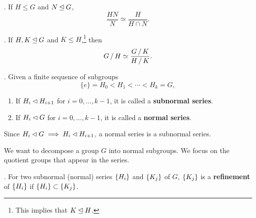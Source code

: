 \thm.  If \(H \leq G\) and \(N \unlhd G\),
\[
    \frac{HN}{N} \simeq \frac{H}{H\cap N}.
\]
\begin{center}
\end{center}

\thm.  If \(H, K \unlhd G\) and \(K \leq H\),\footnote{This implies that \(K \unlhd H\).} then
\[
    G \operatorname{/} H \simeq \frac{G \operatorname{/} K}{H \operatorname{/} K}.
\]


. Given a finite sequence of subgroups
\[
    \{e\} = H_0 < H_1 < \cdots < H_k = G,
\]
\begin{enumerate}
    \item {} If \(H_i \lhd H_{i+1}\) for \(i = 0, \dots, k - 1\), it is called a \textbf{subnormal series}.
    \item {} If \(H_i \lhd G\) for \(i = 0, \dots, k - 1\), it is called a \textbf{normal series}.
\end{enumerate}

\rmk Since \(H_i \lhd G \implies H_i \lhd H_{i+1}\), a normal series is a subnormal series.

We want to decompose a group \(G\) into normal subgroups. We focus on the quotient groups that appear in the series.

.  For two subnormal (normal) series \(\left\{ H_i \right\}\) and \(\left\{ K_j \right\}\) of \(G\), \(\left\{ K_j \right\}\) is a \textbf{refinement} of \(\left\{ H_i \right\}\) if \(\left\{ H_i \right\} \subset \left\{ K_j \right\}\).

